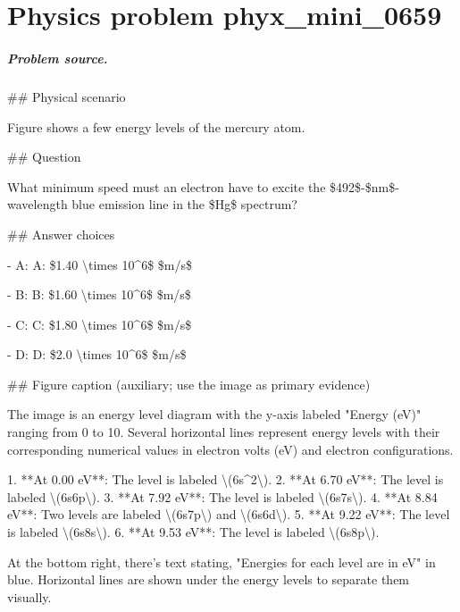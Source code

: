 
\chapter{Physics problem phyx\_mini\_0659}
\label{ch:PhyXMiniProblems_problem_phyx_mini_0659}

\paragraph{Problem source.}
\#\# Physical scenario

Figure shows a few energy levels of the mercury atom.

\#\# Question

What minimum speed must an electron have to excite the \$492\$-\$nm\$-wavelength blue emission line in the \$Hg\$ spectrum?

\#\# Answer choices

- A: A: \$1.40 \textbackslash{}times 10\textasciicircum{}6\$ \$m/s\$

- B: B: \$1.60 \textbackslash{}times 10\textasciicircum{}6\$ \$m/s\$

- C: C: \$1.80 \textbackslash{}times 10\textasciicircum{}6\$ \$m/s\$

- D: D: \$2.0 \textbackslash{}times 10\textasciicircum{}6\$ \$m/s\$

\#\# Figure caption (auxiliary; use the image as primary evidence)

The image is an energy level diagram with the y-axis labeled "Energy (eV)" ranging from 0 to 10. Several horizontal lines represent energy levels with their corresponding numerical values in electron volts (eV) and electron configurations. 

1. **At 0.00 eV**: The level is labeled \textbackslash{}(6s\textasciicircum{}2\textbackslash{}).
2. **At 6.70 eV**: The level is labeled \textbackslash{}(6s6p\textbackslash{}).
3. **At 7.92 eV**: The level is labeled \textbackslash{}(6s7s\textbackslash{}).
4. **At 8.84 eV**: Two levels are labeled \textbackslash{}(6s7p\textbackslash{}) and \textbackslash{}(6s6d\textbackslash{}).
5. **At 9.22 eV**: The level is labeled \textbackslash{}(6s8s\textbackslash{}).
6. **At 9.53 eV**: The level is labeled \textbackslash{}(6s8p\textbackslash{}).

At the bottom right, there's text stating, "Energies for each level are in eV" in blue. Horizontal lines are shown under the energy levels to separate them visually.

